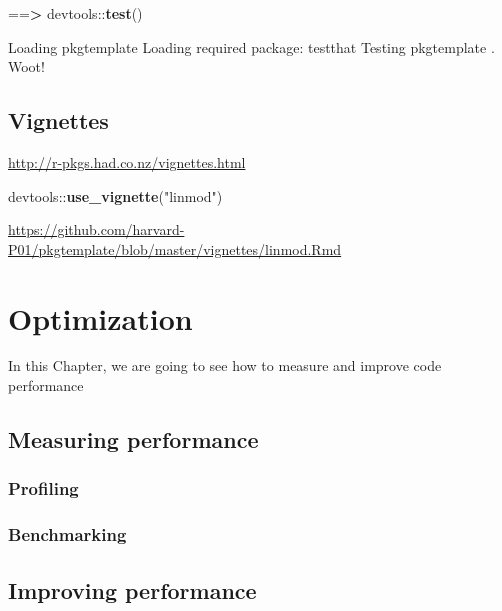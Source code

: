 \documentclass[]{book}
\newenvironment{Shaded}{\begin{snugshade}}{\end{snugshade}}
\newcommand{\KeywordTok}[1]{\textcolor[rgb]{0.13,0.29,0.53}{\textbf{{#1}}}}
\newcommand{\StringTok}[1]{\textcolor[rgb]{0.31,0.60,0.02}{{#1}}}
\newcommand{\ErrorTok}[1]{\textcolor[rgb]{0.64,0.00,0.00}{\textbf{{#1}}}}
\newcommand{\NormalTok}[1]{{#1}}
\theoremstyle{definition}
\theoremstyle{definition}
\theoremstyle{definition}
\theoremstyle{remark}
\begin{document}
\begin{Shaded}
\begin{Highlighting}[]
\NormalTok{==}\ErrorTok{>}\StringTok{ }\NormalTok{devtools::}\KeywordTok{test}\NormalTok{()}

\NormalTok{Loading pkgtemplate}
\NormalTok{Loading required package:}\StringTok{ }\NormalTok{testthat}
\NormalTok{Testing pkgtemplate}
\NormalTok{.}
\NormalTok{Woot!}\StringTok{ }
\end{Highlighting}
\end{Shaded}

\section{Vignettes}\label{vignettes}

\url{http://r-pkgs.had.co.nz/vignettes.html}

\begin{Shaded}
\begin{Highlighting}[]
\NormalTok{devtools::}\KeywordTok{use_vignette}\NormalTok{(}\StringTok{"linmod"}\NormalTok{)}
\end{Highlighting}
\end{Shaded}

\url{https://github.com/harvard-P01/pkgtemplate/blob/master/vignettes/linmod.Rmd}

\chapter{Optimization}\label{optimization}

In this Chapter, we are going to see how to measure and improve code
performance

\section{Measuring performance}\label{measuring-performance}

\subsection{Profiling}\label{profiling}

\subsection{Benchmarking}\label{benchmarking}

\section{Improving performance}\label{improving-performance}
\end{document}
